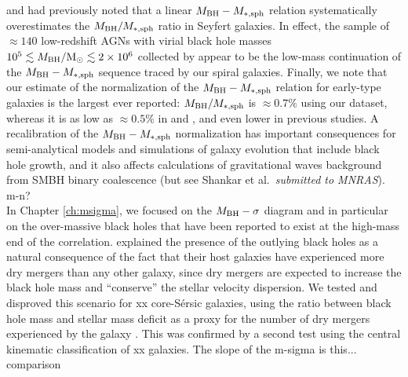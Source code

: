 \citet{wandel1999} and \citet{ryan2007} had previously noted that a linear $M_{\rm BH} - M_{\rm *,sph}$ relation 
systematically overestimates the $M_{\rm BH}/M_{\rm *,sph}$ ratio in Seyfert galaxies. 
In effect, the sample of $\approx 140$ low-redshift AGNs with virial black hole masses 
$10^5 \lesssim M_{\rm BH}/{\rm M_\odot} \lesssim 2 \times 10^6$ collected by \citet{grahamscott2015} 
appear to be the low-mass continuation of the $M_{\rm BH} - M_{\rm *,sph}$ sequence traced by our spiral galaxies. 
Finally, we note that our estimate of the normalization of the $M_{\rm BH} - M_{\rm *,sph}$ relation for early-type galaxies 
is the largest ever reported: $M_{\rm BH}/M_{\rm *,sph}$ is $\approx 0.7\%$ using our dataset, 
whereas it is as low as $\approx 0.5\%$ in \citet{scott2013} and \citet{kormendyho2013}, 
and even lower in previous studies. 
A recalibration of the $M_{\rm BH} - M_{\rm *,sph}$ normalization has important consequences 
for semi-analytical models and simulations of galaxy evolution that include black hole growth, 
and it also affects calculations of gravitational waves background from SMBH binary coalescence 
(but see Shankar et al.~\emph{submitted to MNRAS}). \\

m-n? \\

In Chapter \ref{ch:msigma}, we focused on the $M_{\rm BH} - \sigma$ diagram 
and in particular on the over-massive black holes that have been reported to exist 
at the high-mass end of the correlation. 
\citet{volontericiotti2013} explained the presence of the outlying black holes 
as a natural consequence of the fact that their host galaxies have experienced more dry mergers 
than any other galaxy, 
since dry mergers are expected to increase the black hole mass 
and ``conserve'' the stellar velocity dispersion. 
We tested and disproved this scenario for xx core-S\'ersic galaxies, 
using the ratio between black hole mass and stellar mass deficit as a proxy 
for the number of dry mergers experienced by the galaxy \citep{xxx}. 
This was confirmed by a second test using the central kinematic classification of xx galaxies. 
The slope of the m-sigma is this... 
comparison










 

